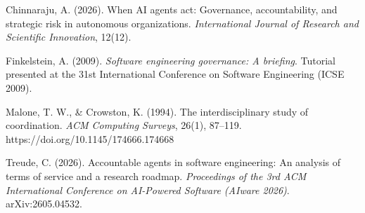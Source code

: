 \documentclass[
  11pt,
]{article}
\begin{document}
Chinnaraju, A. (2026). When AI agents act: Governance, accountability,
and strategic risk in autonomous organizations. \emph{International
Journal of Research and Scientific Innovation}, 12(12).

Finkelstein, A. (2009). \emph{Software engineering governance: A
briefing}. Tutorial presented at the 31st International Conference on
Software Engineering (ICSE 2009).

Malone, T. W., \& Crowston, K. (1994). The interdisciplinary study of
coordination. \emph{ACM Computing Surveys}, 26(1), 87--119.
https://doi.org/10.1145/174666.174668

Treude, C. (2026). Accountable agents in software engineering: An
analysis of terms of service and a research roadmap. \emph{Proceedings
of the 3rd ACM International Conference on AI-Powered Software (AIware
2026)}. arXiv:2605.04532.
\end{document}
